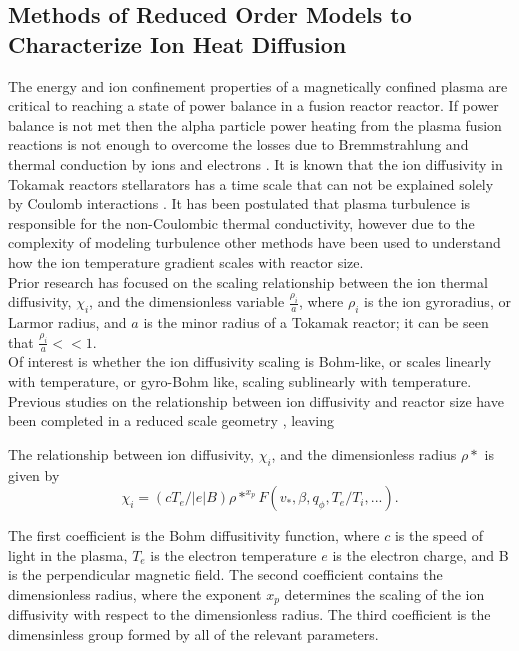 \documentclass{article}
\begin{document}
\subsection{Methods of Reduced Order Models to Characterize Ion Heat Diffusion}
The energy and ion confinement properties of a magnetically confined plasma are critical to reaching a state of power balance in a fusion reactor reactor. If power balance is not met then the alpha particle power heating from the plasma fusion reactions is not enough to overcome the losses due to Bremmstrahlung and thermal conduction by ions and electrons \cite{J_Friedberg:1}. It is known that the ion diffusivity in Tokamak reactors stellarators has a time scale that can not be explained solely by Coulomb interactions \cite{Gyro_Petty}.  It has been postulated that plasma turbulence is responsible for the non-Coulombic thermal conductivity, however due to the complexity of modeling turbulence other methods have been used to understand how the ion temperature gradient scales with reactor size.\\

Prior research \cite{Yas_Ido}  has focused on the scaling relationship between the ion thermal diffusivity, $\chi_i$, and the dimensionless variable  $\frac{\rho_i}{a}$,  where $\rho_i$ is the ion gyroradius, or Larmor radius, and $a$ is the minor radius of a Tokamak reactor;  it can be seen that  $\frac{\rho_i}{a}<<1$.\\

Of interest is whether the ion diffusivity scaling is Bohm-like, or scales linearly with temperature, or gyro-Bohm like, scaling sublinearly with temperature.\\

Previous studies on the relationship between ion diffusivity and reactor size have been completed in a reduced scale geometry \cite{Yas_Ido}, leaving


The relationship between ion diffusivity, $\chi_i$, and the dimensionless radius $\rho*$ is given by
$$
\chi_i = (cT_e/|e|B )\rho*^{x_p}F(v_*, \beta, q_{\phi}, T_e/T_i, ...).
$$

The first coefficient is the Bohm diffusitivity function, where $c$ is the speed of light in the plasma, $T_e$ is the electron temperature $e$ is the electron charge, and B is the perpendicular magnetic field. The second coefficient contains the dimensionless radius, where the exponent $x_p$ determines the scaling of the ion diffusivity with respect to the dimensionless radius. The third coefficient is the dimensinless group formed by all of the relevant parameters.\\
\end{document}
